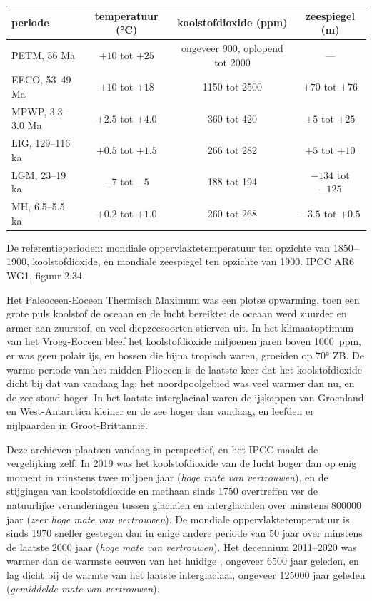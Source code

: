 \begin{center}
\small
\begin{tabular}{|l|c|c|c|}
\hline
\textbf{periode} & \textbf{temperatuur (\unit{\degreeCelsius})} & \textbf{koolstofdioxide (ppm)} & \textbf{zeespiegel (m)} \\
\hline
PETM, 56 Ma & $+10$ tot $+25$ & ongeveer 900, oplopend tot 2000 & --- \\
EECO, 53--49 Ma & $+10$ tot $+18$ & 1150 tot 2500 & $+70$ tot $+76$ \\
MPWP, 3.3--3.0 Ma & $+2.5$ tot $+4.0$ & 360 tot 420 & $+5$ tot $+25$ \\
LIG, 129--116 ka & $+0.5$ tot $+1.5$ & 266 tot 282 & $+5$ tot $+10$ \\
\textcolor{omCold}{LGM, 23--19 ka} & \textcolor{omCold}{$-7$ tot $-5$} & \textcolor{omCold}{188 tot 194} & \textcolor{omCold}{$-134$ tot $-125$} \\
MH, 6.5--5.5 ka & $+0.2$ tot $+1.0$ & 260 tot 268 & $-3.5$ tot $+0.5$ \\
\hline
\end{tabular}

\medskip
{\small De referentieperioden: mondiale oppervlaktetemperatuur ten opzichte van
1850--1900, koolstofdioxide, en mondiale zeespiegel ten opzichte van 1900. IPCC
AR6 WG1, figuur 2.34.}
\end{center}

Het Paleoceen-Eoceen Thermisch Maximum was een plotse opwarming, toen een grote
puls koolstof de oceaan en de lucht bereikte: de oceaan werd zuurder
en armer aan zuurstof, en veel diepzeesoorten stierven uit. In het klimaatoptimum
van het Vroeg-Eoceen bleef het koolstofdioxide miljoenen jaren boven \qty{1000}{ppm},
er was geen polair ijs, en bossen die bijna tropisch waren, groeiden
op \ang{70} ZB. De warme periode van het midden-Plioceen is de laatste keer dat het koolstofdioxide
dicht bij dat van vandaag lag: het noordpoolgebied was veel warmer dan nu, en de zee
stond hoger. In het laatste interglaciaal waren de ijskappen van Groenland en West-Antarctica
kleiner en de zee hoger dan vandaag, en leefden er nijlpaarden
in Groot-Brittannië.

Deze archieven plaatsen vandaag in perspectief, en het IPCC maakt de vergelijking
zelf. In 2019 was het koolstofdioxide van de lucht hoger dan op enig moment in
minstens twee miljoen jaar (\emph{hoge mate van vertrouwen}), en de stijgingen van koolstofdioxide
en methaan sinds 1750 overtreffen ver de natuurlijke veranderingen tussen glacialen
en interglacialen over minstens \num{800000} jaar (\emph{zeer hoge mate
van vertrouwen}). De mondiale oppervlaktetemperatuur is sinds 1970 sneller gestegen dan
in enige andere periode van 50 jaar over minstens de laatste \num{2000} jaar
(\emph{hoge mate van vertrouwen}). Het decennium 2011--2020 was warmer dan de warmste
eeuwen van het huidige , ongeveer \num{6500} jaar geleden, en lag dicht
bij de warmte van het laatste interglaciaal, ongeveer \num{125000} jaar geleden
(\emph{gemiddelde mate van vertrouwen}).

